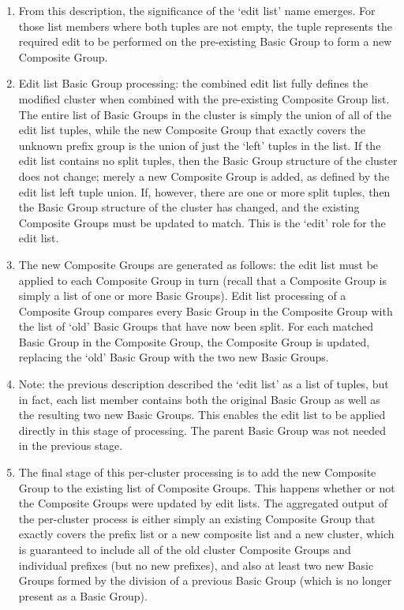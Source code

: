 \begin{enumerate}
	\item From this description, the significance of the `edit list' name emerges. For those list members where both tuples are not empty, the tuple represents the required edit to be performed on the pre-existing Basic Group to form a new Composite Group.
	\item Edit list Basic Group processing: the combined edit list fully defines the modified cluster when combined with the pre-existing Composite Group list. The entire list of Basic Groups in the cluster is simply the union of all of the edit list tuples, while the new Composite Group that exactly covers the unknown prefix group is the union of just the `left' tuples in the list. If the edit list contains no split tuples, then the Basic Group structure of the cluster does not change; merely a new Composite Group is added, as defined by the edit list left tuple union. If, however, there are one or more split tuples, then the Basic Group structure of the cluster has changed, and the existing Composite Groups must be updated to match. This is the `edit' role for the edit list.
	\item The new Composite Groups are generated as follows: the edit list must be applied to each Composite Group in turn (recall that a Composite Group is simply a list of one or more Basic Groups). Edit list processing of a Composite Group compares every Basic Group in the Composite Group with the list of `old' Basic Groups that have now been split. For each matched Basic Group in the Composite Group, the Composite Group is updated, replacing the `old' Basic Group with the two new Basic Groups.
	\item Note: the previous description described the `edit list' as a list of tuples, but in fact, each list member contains both the original Basic Group as well as the resulting two new Basic Groups. This enables the edit list to be applied directly in this stage of processing. The parent Basic Group was not needed in the previous stage.
	\item The final stage of this per-cluster processing is to add the new Composite Group to the existing list of Composite Groups. This happens whether or not the Composite Groups were updated by edit lists. The aggregated output of the per-cluster process is either simply an existing Composite Group that exactly covers the prefix list or a new composite list and a new cluster, which is guaranteed to include all of the old cluster Composite Groups and individual prefixes (but no new prefixes), and also at least two new Basic Groups formed by the division of a previous Basic Group (which is no longer present as a Basic Group).

\end{enumerate}
